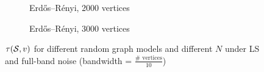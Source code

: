 \begin{figure}
    \hfill
    \begin{subfigure}{0.3\columnwidth}
    \caption{Erdős–Rényi, 2000 vertices}%
    \label{snr_ER_2000}%
    \end{subfigure}
    \hfill%
    \begin{subfigure}{0.3\columnwidth}
    \caption{Erdős–Rényi, 3000 vertices}%
    \label{snr_ER_3000}%
    \end{subfigure}%
    \caption{$\tau(\mathcal{S},v)$ for different random graph models and different $N$ under LS and full-band noise (bandwidth = $\frac{\# \text{ vertices}}{10}$)}
\label{LS_SNR_Threshold_plots_all}
\end{figure}

